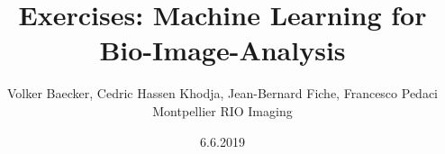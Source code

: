 \documentclass{book}
\begin{document}
\title{Exercises: Machine Learning for Bio-Image-Analysis}
\author{Volker Baecker, Cedric Hassen Khodja, Jean-Bernard Fiche, Francesco Pedaci\\Montpellier RIO Imaging}
\date{6.6.2019}
\maketitle
\tableofcontents
\listoffigures




\end{document}
